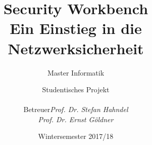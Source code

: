
\title{Security Workbench\\ Ein Einstieg in die Netzwerksicherheit}
\subtitle{Master Informatik}
\subject{DOKUMENTATION}

\author{Studentisches Projekt \\[0.5cm]
\begin{tabular}{rl}
Betreuer & \emph{Prof. Dr. Stefan Hahndel}\\
 & \emph{Prof. Dr. Ernst Göldner}
\end{tabular}
}

\date{Wintersemester 2017/18}


\tableofcontents
\clearpage
\listoffigures
\clearpage






















